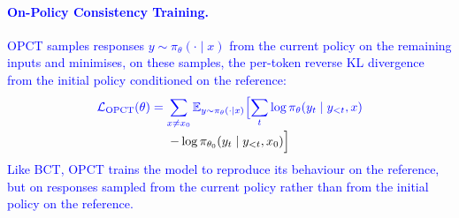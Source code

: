 \documentclass{article}
\begin{document}
\paragraph{\textcolor{blue}{On-Policy Consistency Training.}}
\textcolor{blue}{OPCT \citep{han2026onpolicy} samples responses $y \sim \pi_\theta(\cdot \mid x)$ from the current policy on the remaining inputs and minimises, on these samples, the per-token reverse KL divergence from the initial policy conditioned on the reference:}
\begin{multline}\color{blue}
\mathcal{L}_{\text{OPCT}}(\theta) = \sum_{x \neq x_0} \mathbb{E}_{y \sim \pi_\theta(\cdot \mid x)}\Bigl[\sum_{t} \log \pi_\theta(y_t \mid y_{<t}, x)\\[-2pt] - \log \pi_{\theta_0}(y_t \mid y_{<t}, x_0)\Bigr]
\end{multline}
\textcolor{blue}{Like BCT, OPCT trains the model to reproduce its behaviour on the reference, but on responses sampled from the current policy rather than from the initial policy on the reference.}
\end{document}
